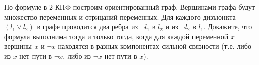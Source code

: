По формуле в 2-КНФ  построим ориентированный граф. Вершинами графа будут множество переменных и отрицаний переменных. Для
каждого дизъюнкта $(l_1\lor l_2)$ в графе проводится два ребра из $\lnot l_1$ в $l_2$ и из $\lnot l_2$ в $l_1$. Докажите, что
формула выполнима тогда и только тогда, когда для каждой переменной $x$ вершины $x$ и $\lnot x$ находятся в разных
компонентах сильной связности (т.е. либо из $x$ нет пути в $\lnot x$, либо из $\lnot x$ нет пути в $x$).